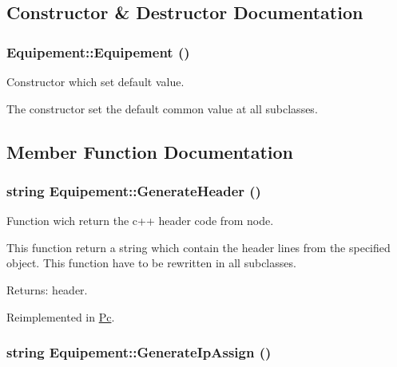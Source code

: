 \subsection{Constructor \& Destructor Documentation}
\hypertarget{class_equipement_9057a4777d006cbac4c72d09a8d09407}{
\subsubsection[{Equipement}]{\setlength{\rightskip}{0pt plus 5cm}Equipement::Equipement ()}}
\label{class_equipement_9057a4777d006cbac4c72d09a8d09407}


Constructor which set default value. 

The constructor set the default common value at all subclasses. 

\subsection{Member Function Documentation}
\hypertarget{class_equipement_8d24220539ff36aeb021daaec32f729e}{
\subsubsection[{GenerateHeader}]{\setlength{\rightskip}{0pt plus 5cm}string Equipement::GenerateHeader ()}}
\label{class_equipement_8d24220539ff36aeb021daaec32f729e}


Function wich return the c++ header code from node. 

This function return a string which contain the header lines from the specified object. This function have to be rewritten in all subclasses.

\begin{Desc}
\item[Returns:]header. \end{Desc}


Reimplemented in \hyperlink{class_pc_a84eb29bce881921ec8f591dfd5b8ba0}{Pc}.\hypertarget{class_equipement_d1e684114ebf6746f77cc370cdb449e5}{
\subsubsection[{GenerateIpAssign}]{\setlength{\rightskip}{0pt plus 5cm}string Equipement::GenerateIpAssign ()}}
\label{class_equipement_d1e684114ebf6746f77cc370cdb449e5}


